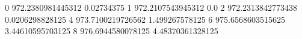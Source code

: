 0 972.2380981445312 0.02734375
1 972.2107543945312 0.0
2 972.2313842773438 0.0206298828125
4 973.7100219726562 1.499267578125
6 975.6568603515625 3.44610595703125
8 976.6944580078125 4.48370361328125
